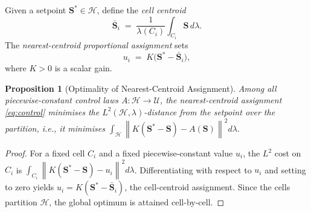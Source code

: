 \documentclass[10pt,twocolumn]{article}
\theoremstyle{plain}
\newtheorem{proposition}[theorem]{Proposition}
\theoremstyle{definition}
\theoremstyle{remark}
\newcommand{\Hcal}{\mathcal{H}}
\newcommand{\Ucal}{\mathcal{U}}
\newcommand{\norm}[1]{\left\|#1\right\|}
\newcommand{\Sstar}{\mathbf{S}^{*}}
\begin{document}
Given a setpoint $\Sstar \in \Hcal$, define the \emph{cell centroid}
\begin{equation}
  \bar{\mathbf{S}}_i \;=\; \frac{1}{\lambda(C_i)}
                 \int_{C_i} \mathbf{S}\,d\lambda.
  \label{eq:centroid}
\end{equation}
The \emph{nearest-centroid proportional assignment} sets
\begin{equation}
  u_i \;=\; K\bigl(\Sstar - \bar{\mathbf{S}}_i\bigr),
  \label{eq:control}
\end{equation}
where $K > 0$ is a scalar gain.

\begin{proposition}[Optimality of Nearest-Centroid Assignment]
\label{prop:optimal}
Among all piecewise-constant control laws $A: \Hcal \to \Ucal$, the
nearest-centroid assignment \eqref{eq:control} minimises the
$L^2(\Hcal,\lambda)$-distance from the setpoint over the partition,
i.e., it minimises
$\int_\Hcal \norm{K(\Sstar - \mathbf{S}) - A(\mathbf{S})}^2 d\lambda$.
\end{proposition}

\begin{proof}
For a fixed cell $C_i$ and a fixed piecewise-constant value $u_i$, the
$L^2$ cost on $C_i$ is
$\int_{C_i}\norm{K(\Sstar-\mathbf{S})-u_i}^2 d\lambda$.
Differentiating with respect to $u_i$ and setting to zero yields
$u_i = K(\Sstar - \bar{\mathbf{S}}_i)$,
the cell-centroid assignment.  Since the cells partition $\Hcal$, the
global optimum is attained cell-by-cell.
\end{proof}
\end{document}
